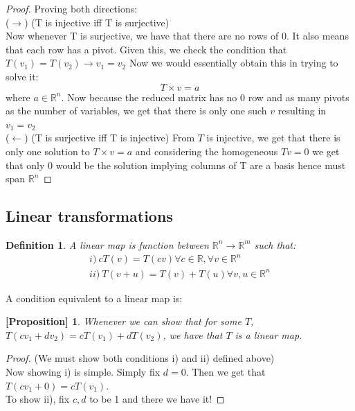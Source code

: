 \documentclass{article}
\newtheorem{prop}{[Proposition]}
\newtheorem{definition}{Definition}[subsection]
\numberwithin{equation}{subsection}
\begin{document}
\begin{proof} Proving both directions:
\\
($\rightarrow$) (T is injective iff T is surjective)
\\
Now whenever T is surjective, we have that there are no rows of 0. It also means that each row has a pivot. Given this, we check the condition that $T(v_{1}) = T(v_{2}) \rightarrow v_{1} = v_{2}$ Now we would essentially obtain this in trying to solve it:
\begin{equation*}
    T \times v = a
\end{equation*}
where $a \in \mathbb{R}^n$. Now because the reduced matrix has no 0 row and as many pivots as the number of variables, we get that there is only one such $v$ resulting in $v_{1} = v_{2}$
\\
($\leftarrow$) (T is surjective iff T is injective)
From $T$ is injective, we get that there is only one solution to $T \times v = a$ and considering the homogeneous $Tv=0$ we get that only 0 would be the solution implying columns of T are a basis hence must span $\mathbb{R}^n$
 \tag*{\qedhere}

\end{proof}

\subsection{Linear transformations}

\begin{definition}
A linear map is function between $\mathbb{R}^n \to \mathbb{R}^m$ such that:
\begin{align*}
    i) \ cT(v) = T(cv) \forall c \in \mathbb{R}, \forall v \in \mathbb{R}^n\\
    ii) \ T(v + u) = T(v) + T(u) \forall v,u \in \mathbb{R}^n
\end{align*}
\end{definition}

A condition equivalent to a linear map is:
\begin{prop}
Whenever we can show that for some $T$, $T(cv_{1} + dv_{2}) = cT(v_{1}) + dT(v_{2})$, we have that $T$ is a linear map.
\end{prop}

\begin{proof}(We must show both conditions i) and ii) defined above)
\\

Now showing i) is simple. Simply fix $d=0$. Then we get that $T(cv_{1} + 0) = cT(v_{1})$.
\\

To show ii), fix $c,d$ to be 1 and there we have it!

\end{proof}
\end{document}

